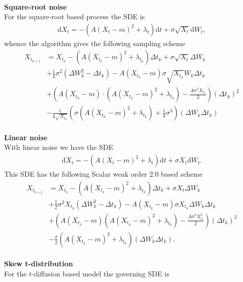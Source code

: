 \\
\textbf{Square-root noise}\\
For the square-root based process the SDE is
\begin{align}
    \mathrm{d}X_t = -\left(A(X_t - m)^2 + \lambda_t\right)\mathrm{d}t + \sigma \sqrt{X_t}\mathrm{d}W_t,
\end{align}
whence the algorithm gives the following sampling scheme 
\begin{align}
    X_{t_{k + 1}} &= X_{t_k} - \left(A(X_{t_k} - m)^2 + \lambda_{t_k}\right) \Delta t_k + \sigma \sqrt{X_t} \Delta W_{k}\nonumber\\ &+ \frac{1}{4}\sigma^2 \left(\Delta W_k^2 - \Delta t_k\right)     - A\left(X_{t_k} - m\right)\sigma \sqrt{X_{t_k}} W_k \Delta t_k
    \nonumber\\
     &+ \left(A\left(X_{t_k} - m\right)\cdot \left(A\left(X_{t_k} - m\right)^2 + \lambda_{t_k}\right) - \frac{A\sigma^2 X_{t_k}}{2}\right)(\Delta t_k)^2 \nonumber\\
    &- \frac{1}{4\sqrt{X_{t_k}}}\left(\sigma\left(A\left(X_{t_k} - m\right)^2 + \lambda_{t_k}\right) + \frac{1}{4}\sigma^3\right) \left(\Delta W_k \Delta t_k\right)
\end{align}
\\
\textbf{Linear noise}\\
With linear noise we have the SDE
\begin{align}
    \mathrm{d}X_t = -\left(A(X_t - m)^2 + \lambda_t\right)\mathrm{d}t + \sigma X_t\mathrm{d}W_t.
\end{align}
This SDE has the following Scalar weak order 2.0 based scheme
\begin{align}
    X_{t_{k + 1}} &= X_{t_k} - \left(A(X_{t_k} - m)^2 + \lambda_{t_k}\right) \Delta t_k + \sigma X_t \Delta W_{k} \nonumber \\ &
    + \frac{1}{2}\sigma^2 X_{t_k}\left(\Delta W_{k}^2 - \Delta t_k\right) -A(X_{t_k} - m)\sigma X_{t_k} \Delta W_k\Delta t_k \nonumber\\
    & + \left(A\left(X_{t_k} - m\right)\left(A\left(X_{t_k} - m\right)^2 + \lambda_{t_k}\right) - \frac{A\sigma^2X_{t_k}^2}{2}\right)(\Delta t_k)^2 \nonumber \\
    &- \frac{\sigma}{2}\left(A\left(X_{t_k} - m\right)^2 + \lambda_{t_k}\right)\left(\Delta W_{k}\Delta t_k\right).
\end{align}
\\
\textbf{Skew t-distribution}\\
For the $t$-diffusion based model the governing SDE is

